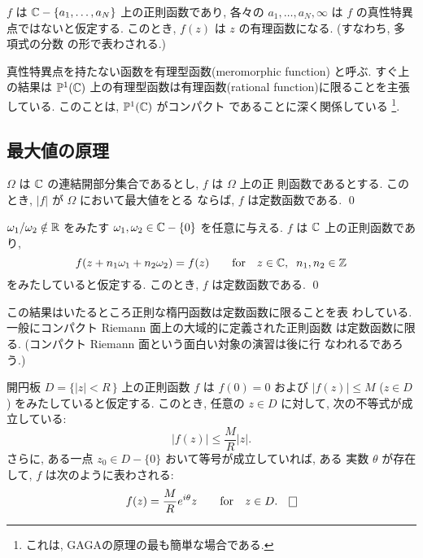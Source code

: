 \documentclass[12pt,twoside]{jarticle}
\begin{document}
\begin{question}
  $f$ は ${\mathbb C}-\{a_1,\dots,a_N\}$ 上の正則函数であり, %
  各々の $a_1,\dots,a_N,\infty$ は $f$ の真性特異点ではないと仮定する.
  このとき, $f(z)$ は $z$ の有理函数になる. (すなわち, 多項式の分数
  の形で表わされる.)
\end{question}

\noindent 真性特異点を持たない函数を有理型函数(meromorphic function) 
と呼ぶ. すぐ上の結果は ${\mathbb P}^1({\mathbb C})$ 上の有理型函数は有理函数(rational
function)に限ることを主張している. このことは, ${\mathbb P}^1({\mathbb C})$ がコンパクト
であることに深く関係している%
\footnote{これは, GAGAの原理の最も簡単な場合である.}.



\subsection{最大値の原理}

\begin{question}[最大絶対値の原理]
  $\Omega$ は ${\mathbb C}$ の連結開部分集合であるとし, $f$ は $\Omega$ 上の正
  則函数であるとする. このとき, $|f|$ が $\Omega$ において最大値をとる
  ならば, $f$ は定数函数である. \qed
\end{question}

\begin{question}
  $\omega_1/\omega_2\notin{\mathbb R}$ をみたす $\omega_1,\omega_2\in{\mathbb C}-\{0\}$ 
  を任意に与える. $f$ は ${\mathbb C}$ 上の正則函数であり, 
  \[
    f(z + n_1\omega_1 + n_2\omega_2) = f(z)
    \qquad
    \text{for}
    \quad
    z\in{\mathbb C},\;\; n_1,n_2\in{\mathbb Z}
  \]%
  をみたしていると仮定する. このとき, $f$ は定数函数である. \qed
\end{question}

\noindent この結果はいたるところ正則な楕円函数は定数函数に限ることを表
わしている. 一般にコンパクト Riemann 面上の大域的に定義された正則函数
は定数函数に限る. (コンパクト Riemann 面という面白い対象の演習は後に行
なわれるであろう.)


\begin{question}
  開円板 $D=\{|z|<R\,\}$ 上の正則函数 $f$ は $f(0)=0$ および 
  $|f(z)|\le M$ ($z\in D$) をみたしていると仮定する. このとき, 任意の 
  $z\in D$ に対して, 次の不等式が成立している:
  \[
    |f(z)| \le \frac{M}{R} |z|.
  \]%
  さらに, ある一点 $z_0\in D - \{0\}$ おいて等号が成立していれば, ある
  実数 $\theta$ が存在して, $f$ は次のように表わされる:
  \[
    f(z) = \frac{M}{R} e^{i\theta} z
    \qquad
    \text{for}
    \quad
    z \in D.
  \qed
  \]%
\end{question}
\end{document}
